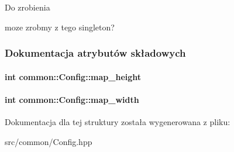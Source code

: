 \begin{DoxyRefDesc}{Do zrobienia}
\item[\hyperlink{todo__todo000001}{Do zrobienia}]moze zrobmy z tego singleton? \end{DoxyRefDesc}


\subsubsection{Dokumentacja atrybutów składowych}
\hypertarget{structcommon_1_1Config_a7e50e6e401ae5f70ac0a8ae2ae20f1d5}{
\paragraph[{map\-\_\-height}]{\setlength{\rightskip}{0pt plus 5cm}int common\-::\-Config\-::map\-\_\-height}}\label{structcommon_1_1Config_a7e50e6e401ae5f70ac0a8ae2ae20f1d5}
\hypertarget{structcommon_1_1Config_a0cdc7f623f9324dc884c7eeacaafb64e}{
\paragraph[{map\-\_\-width}]{\setlength{\rightskip}{0pt plus 5cm}int common\-::\-Config\-::map\-\_\-width}}\label{structcommon_1_1Config_a0cdc7f623f9324dc884c7eeacaafb64e}


Dokumentacja dla tej struktury została wygenerowana z pliku\-:\begin{DoxyCompactItemize}
\item 
src/common/Config.\-hpp\end{DoxyCompactItemize}
